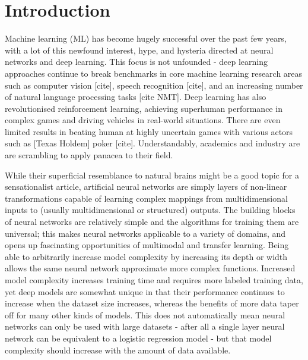 \chapter{Introduction}


Machine learning (ML) has become hugely successful over the past few years, with a lot of this newfound interest, hype, and hysteria directed at  neural networks and deep learning. This focus is not unfounded - deep learning approaches continue to break benchmarks in  core machine learning research areas such as computer vision [cite], speech recognition [cite], and an increasing number of natural language processing tasks [cite NMT].
Deep learning has also revolutionised reinforcement learning, achieving superhuman performance in complex games and driving vehicles in real-world situations.
There are even limited results in  beating human at highly uncertain games with various actors such as [Texas Holdem] poker [cite].
Understandably, academics and industry are are scrambling to apply panacea to their field.

While their superficial resemblance to  natural brains might be  a good topic for a sensationalist article, artificial neural networks are simply layers of non-linear transformations capable of learning complex mappings from multidimensional inputs to (usually multidimensional or structured) outputs.
The building blocks of neural networks are relatively simple and the algorithms for training them are universal; this makes neural networks applicable to a variety of domains, and opens up fascinating opportunities of multimodal and transfer learning.
Being able to arbitrarily increase model complexity by increasing its depth or width allows the same neural network approximate more complex functions.
Increased model complexity increases training time and requires more labeled training data, yet deep models are somewhat unique in that their performance continues to increase when the dataset size increases, whereas the benefits of more data taper off for many other kinds of models.
This does not automatically mean neural networks can only be used with large datasets - after all a single layer neural network can be equivalent to a logistic regression model - but that model complexity should increase with the amount of data available.

